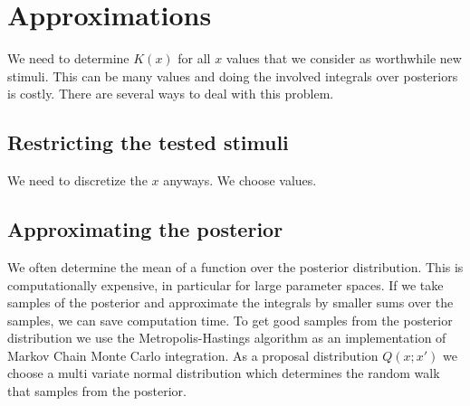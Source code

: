 
\section{Approximations} %
\label{sec:approximations}
We need to determine $K(x)$ for all $x$ values that we consider as worthwhile new stimuli. This can be many values and doing the involved integrals over posteriors is costly.
There are several ways to deal with this problem.

\subsection{Restricting the tested stimuli} %
\label{sub:restricting_the_tested_stimuli}
We need to discretize the $x$ anyways. We choose values.

\subsection{Approximating the posterior} %
 \label{sub:approximating_the_posterior}
We often determine the mean of a function over the posterior distribution. This is computationally expensive, in particular for large parameter spaces.
If we take samples of the posterior and approximate the integrals by smaller sums over the samples, we can save computation time. To get good samples from the posterior distribution we use the Metropolis-Hastings algorithm as an implementation of Markov Chain Monte Carlo integration.
As a proposal distribution $Q(x;x')$ we choose a multi variate normal distribution which determines the random walk that samples from the posterior.

